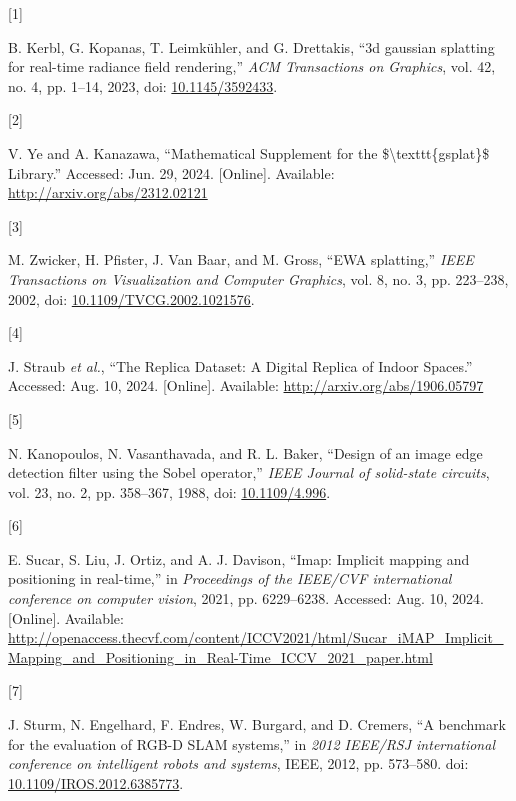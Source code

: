 \documentclass[twocolumn]{article} %
\newlength{\cslhangindent}
\newlength{\csllabelwidth}
\newenvironment{CSLReferences}[2] %
{\begin{list}{}{%
  \setlength{\itemindent}{0pt}
  \setlength{\leftmargin}{0pt}
  \setlength{\parsep}{0pt}
  \ifodd #1
  \setlength{\leftmargin}{\cslhangindent}
  \setlength{\itemindent}{-1\cslhangindent}
  \fi
  \setlength{\itemsep}{#2\baselineskip}}}
{\end{list}}
\newcommand{\CSLLeftMargin}[1]{\parbox[t]{\csllabelwidth}{\strut#1\strut}}
\newcommand{\CSLRightInline}[1]{\parbox[t]{\linewidth - \csllabelwidth}{\strut#1\strut}}
\begin{document}
\label{refs}
\begin{CSLReferences}{0}{0}
\CSLLeftMargin{{[}1{]} }%
\CSLRightInline{B. Kerbl, G. Kopanas, T. Leimkühler, and G. Drettakis,
{``3d gaussian splatting for real-time radiance field rendering,''}
\emph{ACM Transactions on Graphics}, vol. 42, no. 4, pp. 1--14, 2023,
doi: \href{https://doi.org/10.1145/3592433}{10.1145/3592433}.}

\CSLLeftMargin{{[}2{]} }%
\CSLRightInline{V. Ye and A. Kanazawa, {``Mathematical {Supplement} for
the \$\textbackslash texttt\{gsplat\}\$ {Library}.''} Accessed: Jun. 29,
2024. {[}Online{]}. Available: \url{http://arxiv.org/abs/2312.02121}}

\CSLLeftMargin{{[}3{]} }%
\CSLRightInline{M. Zwicker, H. Pfister, J. Van Baar, and M. Gross,
{``{EWA} splatting,''} \emph{IEEE Transactions on Visualization and
Computer Graphics}, vol. 8, no. 3, pp. 223--238, 2002, doi:
\href{https://doi.org/10.1109/TVCG.2002.1021576}{10.1109/TVCG.2002.1021576}.}

\CSLLeftMargin{{[}4{]} }%
\CSLRightInline{J. Straub \emph{et al.}, {``The {Replica Dataset}: {A
Digital Replica} of {Indoor Spaces}.''} Accessed: Aug. 10, 2024.
{[}Online{]}. Available: \url{http://arxiv.org/abs/1906.05797}}

\CSLLeftMargin{{[}5{]} }%
\CSLRightInline{N. Kanopoulos, N. Vasanthavada, and R. L. Baker,
{``Design of an image edge detection filter using the {Sobel}
operator,''} \emph{IEEE Journal of solid-state circuits}, vol. 23, no.
2, pp. 358--367, 1988, doi:
\href{https://doi.org/10.1109/4.996}{10.1109/4.996}.}

\CSLLeftMargin{{[}6{]} }%
\CSLRightInline{E. Sucar, S. Liu, J. Ortiz, and A. J. Davison, {``Imap:
{Implicit} mapping and positioning in real-time,''} in \emph{Proceedings
of the {IEEE}/{CVF} international conference on computer vision}, 2021,
pp. 6229--6238. Accessed: Aug. 10, 2024. {[}Online{]}. Available:
\url{http://openaccess.thecvf.com/content/ICCV2021/html/Sucar_iMAP_Implicit_Mapping_and_Positioning_in_Real-Time_ICCV_2021_paper.html}}

\CSLLeftMargin{{[}7{]} }%
\CSLRightInline{J. Sturm, N. Engelhard, F. Endres, W. Burgard, and D.
Cremers, {``A benchmark for the evaluation of {RGB-D SLAM} systems,''}
in \emph{2012 {IEEE}/{RSJ} international conference on intelligent
robots and systems}, IEEE, 2012, pp. 573--580. doi:
\href{https://doi.org/10.1109/IROS.2012.6385773}{10.1109/IROS.2012.6385773}.}

\end{CSLReferences}
\end{document}
